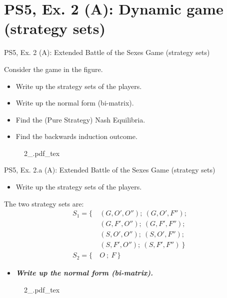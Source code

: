 \section{PS5, Ex. 2 (A): Dynamic game (strategy sets)}

\begin{frame}{PS5, Ex. 2 (A): Extended Battle of the Sexes Game (strategy sets)}
  \begin{multicols}{2}
    Consider the game in the figure.
    \begin{itemize}
      \item[(a)] Write up the strategy sets of the players.
      \item[(b)] Write up the normal form (bi-matrix).
      \item[(c)] Find the (Pure Strategy) Nash Equilibria.
      \item[(d)] Find the backwards induction outcome.
    \end{itemize}
    \vfill\null \columnbreak
    \begin{figure}[!h]
      \center
      \def\svgwidth{\columnwidth}
      {2_.pdf_tex}
    \end{figure}
    \vfill\null
  \end{multicols}
\end{frame}

\begin{frame}{PS5, Ex. 2.a (A): Extended Battle of the Sexes Game (strategy sets)}
  \begin{multicols}{2}
    \begin{itemize}
      \item[(a)] Write up the strategy sets of the players.
    \end{itemize}
    The two strategy sets are:
    \begin{align*}
      S_1=\{\ &(G, O', O'');\ (G, O', F'');\\
              &(G, F', O'');\ (G, F', F'');\\
              &(S, O', O'');\ (S, O', F'');\\
              &(S, F', O'');\ (S, F', F'')\ \}\\
      S_2=\{\ &O\ ;\ F\ \}
    \end{align*}
    \begin{itemize}
      \item[(b)] \textbf{\textit{Write up the normal form (bi-matrix).}}
    \end{itemize}
    \vfill\null \columnbreak
    \begin{figure}[!h]
      \center
      \def\svgwidth{\columnwidth}
      {2_.pdf_tex}
    \end{figure}
    \vfill\null
  \end{multicols}
\end{frame}

